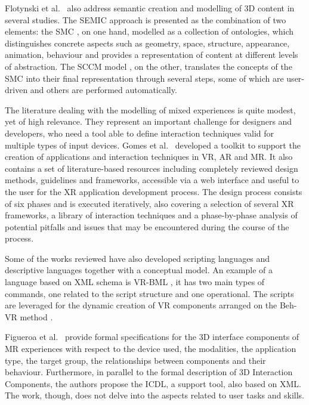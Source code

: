 Flotynski et al.~\cite{flotynski_conceptual_2015, flotynski_ontology-based_2017} also address semantic creation and modelling of 3D content in several studies. The SEMIC approach is presented as the combination of two elements: the SMC \cite{flotynski_semantic_2014, flotynski_semantic_2013, van_der_aalst_conceptual_2013}, on one hand, modelled as a collection of ontologies, which distinguishes concrete aspects such as geometry, space, structure, appearance, animation, behaviour and provides a representation of content at different levels of abstraction. The SCCM model \cite{mohler_semantic_2013}, on the other, translates the concepts of the SMC into their final representation through several steps, some of which are user-driven and others are performed automatically.

The literature dealing with the modelling of mixed experiences is quite modest, yet of high relevance. They represent an important challenge for designers and developers, who need a tool able to define interaction techniques valid for multiple types of input devices. Gomes et al.~\cite{gomes_extended_2020} developed a toolkit to support the creation of applications and interaction techniques in VR, AR and MR. It also contains a set of literature-based resources including completely reviewed design methods, guidelines and frameworks, accessible via a web interface and useful to the user for the XR application development process. The design process consists of six phases and is executed iteratively, also covering a selection of several XR frameworks, a library of interaction techniques and a phase-by-phase analysis of potential pitfalls and issues that may be encountered during the course of the process.

Some of the works reviewed have also developed scripting languages and descriptive languages together with a conceptual model. An example of a language based on XML schema is VR-BML \cite{walczak_structured_2008-1}, it has two main types of commands, one related to the script structure and one operational. The scripts are leveraged for the dynamic creation of VR components arranged on the Beh-VR method \cite{hutchison_beh-vr_2006}.

Figueroa et al.~\cite{figueroa_conceptual_2006} provide formal specifications for the 3D interface components of MR experiences with respect to the device used, the modalities, the application type, the target group, the relationships between components and their behaviour. Furthermore, in parallel to the formal description of 3D Interaction Components, the authors propose the ICDL, a support tool, also based on XML. The work, though, does not delve into the aspects related to user tasks and skills.

